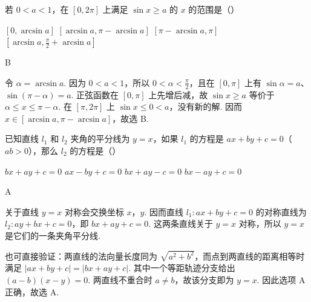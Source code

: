 \documentclass[UTF8,a4paper,oneside,11pt]{ctexbook}
\begin{document}
\begin{problem}
若 \(0<a<1\)，在 \([0,2\pi]\) 上满足 \(\sin x\geqslant a\) 的 \(x\) 的范围是（\quad）

\choices
    {\([0,\arcsin a]\)}
    {\([\arcsin a,\pi-\arcsin a]\)}
    {\([\pi-\arcsin a,\pi]\)}
    {\(\left[\arcsin a,\frac{\pi}{2}+\arcsin a\right]\)}

\begin{answer}
B
\end{answer}

\begin{solution}
令 \(\alpha=\arcsin a\). 因为 \(0<a<1\)，所以 \(0<\alpha<\frac\pi2\)，且在 \([0,\pi]\) 上有 \(\sin\alpha=a\)、\(\sin(\pi-\alpha)=a\). 正弦函数在 \([0,\pi]\) 上先增后减，故 \(\sin x\geqslant a\) 等价于 \(\alpha\leqslant x\leqslant\pi-\alpha\). 在 \([\pi,2\pi]\) 上 \(\sin x\leqslant0<a\)，没有新的解. 因而 \(x\in[\arcsin a,\pi-\arcsin a]\)，故选 B.
\end{solution}
\end{problem}

\begin{problem}
已知直线 \(l_1\) 和 \(l_2\) 夹角的平分线为 \(y=x\)，如果 \(l_1\) 的方程是 \(ax+by+c=0\)（\(ab>0\)），那么 \(l_2\) 的方程是（\quad）

\choices
    {\(bx+ay+c=0\)}
    {\(ax-by+c=0\)}
    {\(bx+ay-c=0\)}
    {\(bx-ay+c=0\)}

\begin{answer}
A
\end{answer}

\begin{solution}
关于直线 \(y=x\) 对称会交换坐标 \(x\)，\(y\). 因而直线 \(l_1:ax+by+c=0\) 的对称直线为
\(l_2:ay+bx+c=0\)，即 \(bx+ay+c=0\). 这两条直线关于 \(y=x\) 对称，所以 \(y=x\) 是它们的一条夹角平分线.

也可直接验证：两直线的法向量长度同为 \(\sqrt{a^2+b^2}\)，而点到两直线的距离相等时满足
\(\left|ax+by+c\right|=\left|bx+ay+c\right|\). 其中一个等距轨迹分支给出
\((a-b)(x-y)=0\). 两直线不重合时 \(a\neq b\)，故该分支即为 \(y=x\). 因此选项 A 正确，故选 A.
\end{solution}
\end{problem}
\end{document}
